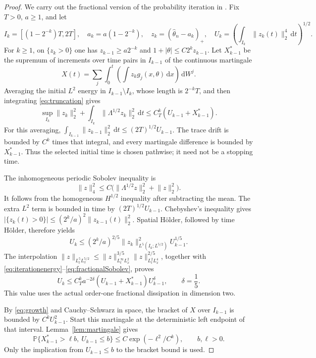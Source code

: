 \documentclass[11pt]{amsart}
\theoremstyle{remark}
\numberwithin{equation}{section}
\newcommand{\PP}{\mathbb P}
\newcommand{\dd}{\,\mathrm d}
\newcommand{\norm}[1]{\lVert#1\rVert}
\begin{document}
\begin{proof}
We carry out the fractional version of the probability iteration in
\cite[Sections 2--3]{HWW}. Fix $T>0$, $a\geq1$, and let
\[
 I_k=[(1-2^{-k})T,2T],\quad a_k=a(1-2^{-k}),\quad
 z_k=(\widehat\theta_n-a_k)_+,\quad
 U_k=\left(\int_{I_k}\norm{z_k(t)}_2^4\dd t\right)^{1/2}.
\]
For $k\geq1$, on $\{z_k>0\}$ one has
$z_{k-1}\geq a2^{-k}$ and $1+|\theta|\leq C2^kz_{k-1}$.
Let $X_{k-1}^*$ be the supremum of increments over time pairs in $I_{k-1}$
of the continuous martingale
\[
 X(t)=\sum_j\int_0^t\left(\int z_k g_j(x,\theta)\dd x\right)\dd W^j.
\]
Averaging the initial $L^2$ energy in
$I_{k-1}\setminus I_k$, whose length is $2^{-k}T$, and then integrating
\eqref{eq:truncation} gives
\begin{equation}\label{eq:iterationenergy}
 \sup_{I_k}\norm{z_k}_2^2+
 \int_{I_k}\norm{\Lambda^{1/2}z_k}_2^2\dd t
 \leq C_T^k(U_{k-1}+X_{k-1}^*).
\end{equation}
For this averaging, $\int_{I_{k-1}}\norm{z_{k-1}}_2^2\dd t
\leq(2T)^{1/2}U_{k-1}$. The trace drift is bounded by $C^k$ times that
integral, and every martingale difference is bounded by $X_{k-1}^*$.
Thus the selected initial time is chosen pathwise; it need not be a stopping
time.

The inhomogeneous periodic Sobolev inequality is
\begin{equation}\label{eq:fractionalSobolev}
 \norm{z}_4^2\leq C\big(\norm{\Lambda^{1/2}z}_2^2+\norm{z}_2^2\big).
\end{equation}
It follows from the homogeneous $H^{1/2}$ inequality after subtracting the
mean. The extra $L^2$ term is bounded in time by $(2T)^{1/2}U_{k-1}$.
Chebyshev's inequality gives
$|\{z_k(t)>0\}|\leq(2^k/a)^2\norm{z_{k-1}(t)}_2^2$.
Spatial H\"older, followed by time H\"older, therefore yields
\[
 U_k\leq(2^k/a)^{2/5}
       \norm{z_k}_{L^5(I_k;L^{5/2})}^2 U_{k-1}^{1/5}.
\]
The interpolation
$\norm{z}_{L^5_tL^{5/2}_x}
\leq\norm{z}_{L^\infty_tL^2_x}^{3/5}
     \norm{z}_{L^2_tL^4_x}^{2/5}$,
together with \eqref{eq:iterationenergy}--\eqref{eq:fractionalSobolev}, proves
\begin{equation}\label{eq:recurrence}
 U_k\leq C_T^k a^{-2\delta}
             (U_{k-1}+X_{k-1}^*)U_{k-1}^\delta,
 \qquad\delta=\frac15.
\end{equation}
This value uses the actual order-one fractional dissipation in dimension two.

By \eqref{eq:growth} and Cauchy--Schwarz in space, the bracket of $X$ over
$I_{k-1}$ is bounded by $C^k U_{k-1}^2$. Start this martingale at the
deterministic left endpoint of that interval. Lemma~\ref{lem:martingale} gives
\begin{equation}\label{eq:iterationprob}
 \PP\{X_{k-1}^*>\ell b,\ U_{k-1}\leq b\}
 \leq C\exp(-\ell^2/C^k),\qquad b,\ell>0.
\end{equation}
Only the implication from $U_{k-1}\leq b$ to the bracket bound is used.


\end{proof}
\end{document}
